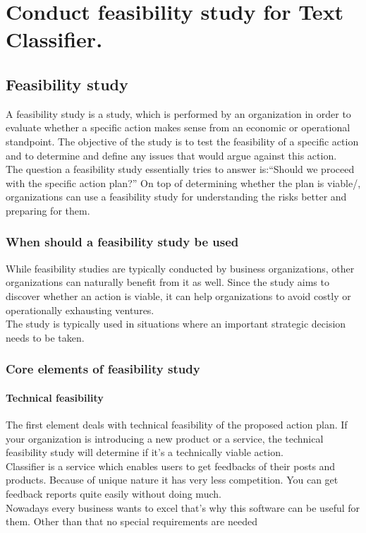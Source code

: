 \chapter{Conduct feasibility study for Text Classifier.}
\label{Practical:1}

\section{Feasibility study}
A feasibility study is a study, which is performed by an organization in order to evaluate whether a specific action makes sense from an economic or operational standpoint. The objective of the study is to test the feasibility of a specific action and to determine and define any issues that would argue against this action.\\
The question a feasibility study essentially tries to answer is:“Should we proceed with the specific action plan?” On top of determining whether the plan is viable/, organizations can use a feasibility study for understanding the risks better and preparing for them.
\subsection{When should a feasibility study be used}
While feasibility studies are typically conducted by business organizations, other organizations can naturally benefit from it as well. Since the study aims to discover whether an action is viable, it can help organizations to avoid costly or operationally exhausting ventures.\\
The study is typically used in situations where an important strategic decision needs to be taken.
\subsection{Core elements of feasibility study}
\subsubsection{Technical feasibility}
The first element deals with technical feasibility of the proposed action plan. If your organization is introducing a new product or a service, the technical feasibility study will determine if it’s a technically viable action.\\
Classifier is a service which enables users to get feedbacks of their posts and products. Because of unique nature it has very less competition. You can get feedback reports quite easily without doing much. \\
Nowadays every business wants to excel that’s why this software can be useful for them. Other than that no special requirements are needed


